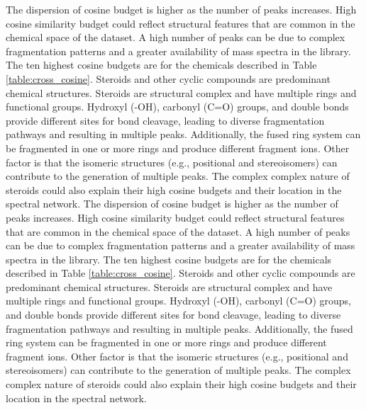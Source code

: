The dispersion of cosine budget is higher as the number of peaks increases. High cosine similarity budget could reflect structural features that are common in the chemical space of the dataset. A high number of peaks can be due to complex fragmentation patterns and a greater availability of mass spectra in the library. The ten highest cosine budgets are for the chemicals described in Table \ref{table:cross_cosine}. Steroids and other cyclic compounds are predominant chemical structures. Steroids are structural complex and have multiple rings and functional groups. Hydroxyl (-OH), carbonyl (C=O) groups, and double bonds provide different sites for bond cleavage, leading to diverse fragmentation pathways and resulting in multiple peaks. Additionally, the fused ring system can be fragmented in one or more rings and produce different fragment ions. Other factor is that the isomeric structures (e.g., positional and stereoisomers) can contribute to the generation of multiple peaks. The complex complex nature of steroids could also explain their high cosine budgets and their location in the spectral network. The dispersion of cosine budget is higher as the number of peaks increases. High cosine similarity budget could reflect structural features that are common in the chemical space of the dataset. A high number of peaks can be due to complex fragmentation patterns and a greater availability of mass spectra in the library. The ten highest cosine budgets are for the chemicals described in Table \ref{table:cross_cosine}. Steroids and other cyclic compounds are predominant chemical structures. Steroids are structural complex and have multiple rings and functional groups. Hydroxyl (-OH), carbonyl (C=O) groups, and double bonds provide different sites for bond cleavage, leading to diverse fragmentation pathways and resulting in multiple peaks. Additionally, the fused ring system can be fragmented in one or more rings and produce different fragment ions. Other factor is that the isomeric structures (e.g., positional and stereoisomers) can contribute to the generation of multiple peaks. The complex complex nature of steroids could also explain their high cosine budgets and their location in the spectral network. 

